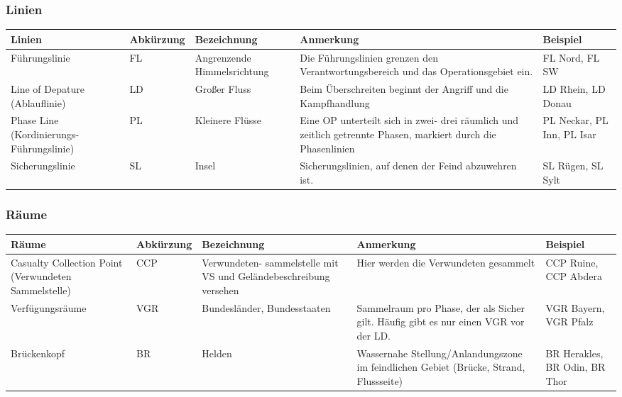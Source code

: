 \subsubsection{Linien}
\begin{longtable}{|p{3cm}|p{}|p{}|p{4cm}|p{}|} 																											\hline
	Linien				&		Abkürzung			&		Bezeichnung				&			Anmerkung 									&		Beispiel 			\\ \hline
	Führungslinie			&		FL				&		Angrenzende Himmelsrichtung	&			Die Führungslinien grenzen \newline den Verantwortungsbereich und \newline das Operationsgebiet ein. & FL Nord, FL SW \\ \hline
	Line of Depature (Ablauflinie)&		LD				&		Großer Fluss				&			Beim Überschreiten beginnt der Angriff und die Kampfhandlung 	&	LD Rhein, LD Donau			\\ \hline
	Phase Line (Kordinierungs-Führungslinie) & PL				&		Kleinere Flüsse			&			Eine OP unterteilt sich in zwei- drei räumlich und zeitlich getrennte Phasen, markiert durch die Phasenlinien	& PL Neckar, PL Inn, PL Isar	\\ \hline
	Sicherungslinie 		&		SL 				&		Insel					&			Sicherungslinien, auf denen der Feind abzuwehren ist.		&	SL Rügen, SL Sylt			\\ \hline
\end{longtable}

\subsubsection{Räume}
\begin{longtable}{|p{3cm}|p{}|p{}|p{4cm}|p{}|} 																											\hline
	Räume			&		Abkürzung			&		Bezeichnung				&			Anmerkung 									&		Beispiel 			\\ \hline
	Casualty Collection Point (Verwundeten Sammelstelle) & CCP	& 		Verwundeten- sammelstelle mit VS und Geländebeschreibung versehen & Hier werden die Verwundeten gesammelt		& 		CCP Ruine, CCP Abdera	\\ \hline
	Verfügungsräume		&		VGR				&		Bundesländer, Bundesstaaten	&			Sammelraum pro Phase, der als Sicher gilt. Häufig gibt es nur einen VGR vor der LD. 	&	VGR Bayern, VGR Pfalz \\ \hline
	Brückenkopf			&		BR				&		Helden				&			Wassernahe Stellung/Anlandungszone  im feindlichen Gebiet (Brücke, Strand, Flussseite)	& BR Herakles, BR Odin, BR Thor \\ \hline
\end{longtable}

